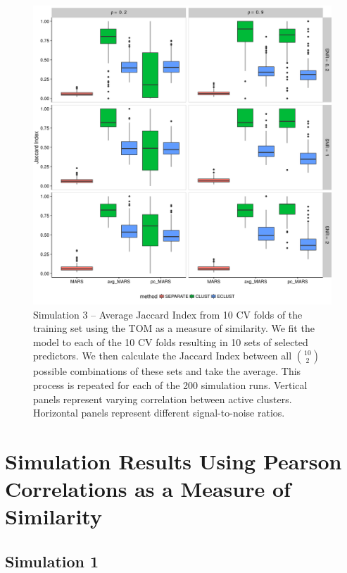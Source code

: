 \begin{appendices}
\begin{figure}[H]
	\centering
	\includegraphics[scale=0.6, keepaspectratio]{./figs/hydra/results/figures/sim3-sept27/jacc_TOM_sim3.png}
	\caption{Simulation 3 -- Average Jaccard Index from 10 CV folds of the training set using the TOM as a measure of similarity. We fit the model to each of the 10 CV folds resulting in 10 sets of selected predictors. We then calculate the Jaccard Index between all $\binom{10}{2}$ possible combinations of these sets and take the average. This process is repeated for each of the 200 simulation runs. Vertical panels represent varying correlation between active clusters. Horizontal panels represent different signal-to-noise ratios.}
	\label{fig:jacc_TOM_sim3}
\end{figure}



\section{Simulation Results Using Pearson Correlations as a Measure of Similarity} \label{ap:sim-Corr}


\subsection*{Simulation 1}


\end{appendices}
